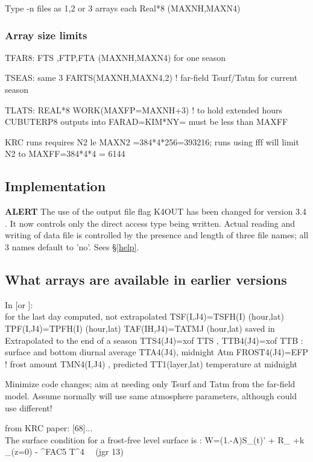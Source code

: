 Type -n files as 1,2 or 3 arrays each Real*8 (MAXNH,MAXN4)
\subsubsection{Array size limits} 
TFAR8: FTS ,FTP,FTA (MAXNH,MAXN4) for one season

TSEAS: same 3
\qi FARTS(MAXNH,MAXN4,2) ! far-field Tsurf/Tatm for current season

TLATS:  REAL*8 WORK(MAXFP=MAXNH+3)        ! to hold extended hours 
 CUBUTERP8 outputs into FARAD=KIM*NY=  must be less than MAXFF

KRC runs requires N2 le MAXN2 =384*4*256=393216; runs using fff will limit N2 to MAXFF=384*4*4 = 6144
\subsection{Implementation} %

\textbf{ALERT} The use of the output file flag K4OUT has been changed for
version 3.4 . It now controls only the direct access type being written. Actual
reading and writing of data file is controlled by the presence and length of
three file names; all 3 names default to 'no'.  Sees \S \ref{help}.



 \subsection{ What arrays are available in earlier versions}
In  [or ]:
\\ for the last day computed, not extrapolated
\qi TSF(I,J4)=TSFH(I) (hour,lat)
\qi TPF(I,J4)=TPFH(I) (hour,lat)
\qi TAF(IH,J4)=TATMJ (hour,lat) saved in 
\\ Extrapolated to the end of a season
 \qi TTS4(J4)=xof TTS , TTB4(J4)=xof TTB  : surface and bottom diurnal average 
 \qi TTA4(J4), midnight Atm
 \qi FROST4(J4)=EFP   ! frost amount
\qi TMN4(I,J4) , predicted TT1(layer,lat) temperature at midnight


Minimize code changes; aim at needing only Tsurf and Tatm from the far-field model.
 Assume normally will use same atmosphere parameters, although could use different!

from KRC paper: [68]...  \small
\\ The surface condition for a frost-free level surface is :
\qbn W=(1.-A)S_{(t)}'  + \Omega \epsilon R_{\Downarrow}
+k _{(z=0)} - \overbrace{ \Omega \epsilon\sigma}^{FAC5} T^4  \ \ (jgr 13) \qen

